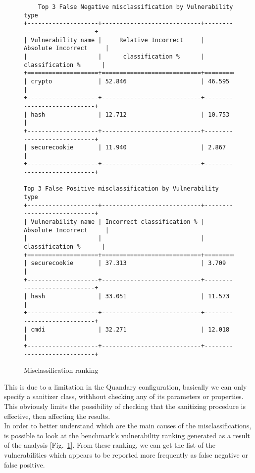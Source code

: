 \documentclass[../Report.tex]{subfiles}
\begin{document}
\begin{figure}
	\begin{center}
		\footnotesize{\begin{verbatim}
	Top 3 False Negative misclassification by Vulnerability type
+--------------------+----------------------------+----------------------------+
| Vulnerability name |     Relative Incorrect     |     Absolute Incorrect     |
|                    |      classification %      |      classification %      |
+====================+============================+============================+
| crypto             | 52.846                     | 46.595                     |
+--------------------+----------------------------+----------------------------+
| hash               | 12.712                     | 10.753                     |
+--------------------+----------------------------+----------------------------+
| securecookie       | 11.940                     | 2.867                      |
+--------------------+----------------------------+----------------------------+

Top 3 False Positive misclassification by Vulnerability type
+--------------------+----------------------------+----------------------------+
| Vulnerability name | Incorrect classification % |     Absolute Incorrect     |
|                    |                            |      classification %      |
+====================+============================+============================+
| securecookie       | 37.313                     | 3.709                      |
+--------------------+----------------------------+----------------------------+
| hash               | 33.051                     | 11.573                     |
+--------------------+----------------------------+----------------------------+
| cmdi               | 32.271                     | 12.018                     |
+--------------------+----------------------------+----------------------------+
			\end{verbatim}
		}
	\end{center}
	\caption{Misclassification ranking}
	\label{table:ranking}
\end{figure}
This is due to a limitation in the Quandary configuration, basically we can only specify a sanitizer class, withhout checking any of its parameters or properties. This obviously limits the possibility of checking that the sanitizing procedure is effective, then affecting the results. \\
In order to better understand which are the main causes of the misclassifications, is possible to look at the benchmark's vulnerability ranking generated as a result of the analysis [Fig.~\ref{table:ranking}]. From these ranking, we can get the list of the vulnerabilities which appears to be reported more frequently as false negative or false positive. 
\end{document}
